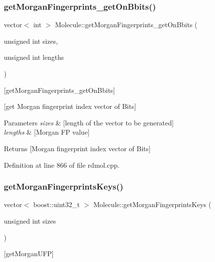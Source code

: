 \subsubsection{\texorpdfstring{get\+Morgan\+Fingerprints\+\_\+get\+On\+Bbits()}{getMorganFingerprints\_getOnBbits()}}
{\footnotesize\ttfamily vector$<$ int $>$ Molecule\+::get\+Morgan\+Fingerprints\+\_\+get\+On\+Bbits (\begin{DoxyParamCaption}\item[{unsigned int}]{sizes,  }\item[{unsigned int}]{lengths }\end{DoxyParamCaption})}



\mbox{[}get\+Morgan\+Fingerprints\+\_\+get\+On\+Bbits\mbox{]} 

\mbox{[}get Morgan fingerprint index vector of Bits\mbox{]}


\begin{DoxyParams}{Parameters}
{\em sizes} & \mbox{[}length of the vector to be generated\mbox{]} \\
\hline
{\em lengths} & \mbox{[}Morgan FP value\mbox{]} \\
\hline
\end{DoxyParams}
\begin{DoxyReturn}{Returns}
\mbox{[}Morgan fingerprint index vector of Bits\mbox{]} 
\end{DoxyReturn}


Definition at line 866 of file rdmol.\+cpp.

\mbox{\label{class_molecule_a773a68572aff26b0fa536588e562e87b}} 
\subsubsection{\texorpdfstring{get\+Morgan\+Fingerprints\+Keys()}{getMorganFingerprintsKeys()}}
{\footnotesize\ttfamily vector$<$ boost\+::uint32\+\_\+t $>$ Molecule\+::get\+Morgan\+Fingerprints\+Keys (\begin{DoxyParamCaption}\item[{unsigned int}]{sizes }\end{DoxyParamCaption})}



\mbox{[}get\+Morgan\+U\+FP\mbox{]} 

